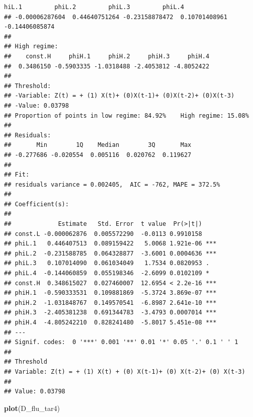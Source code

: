 \documentclass[
]{book}
\newenvironment{Shaded}{\begin{snugshade}}{\end{snugshade}}
\newcommand{\FunctionTok}[1]{\textcolor[rgb]{0.13,0.29,0.53}{\textbf{#1}}}
\newcommand{\NormalTok}[1]{#1}
\begin{document}
\begin{verbatim}
hiL.1         phiL.2         phiL.3         phiL.4 
## -0.00006287604  0.44640751264 -0.23158878472  0.10701408961 -0.14406085874 
## 
## High regime:
##    const.H     phiH.1     phiH.2     phiH.3     phiH.4 
##  0.3486150 -0.5903335 -1.0318488 -2.4053812 -4.8052422 
## 
## Threshold:
## -Variable: Z(t) = + (1) X(t)+ (0)X(t-1)+ (0)X(t-2)+ (0)X(t-3)
## -Value: 0.03798
## Proportion of points in low regime: 84.92%    High regime: 15.08% 
## 
## Residuals:
##       Min        1Q    Median        3Q       Max 
## -0.277686 -0.020554  0.005116  0.020762  0.119627 
## 
## Fit:
## residuals variance = 0.002405,  AIC = -762, MAPE = 372.5%
## 
## Coefficient(s):
## 
##             Estimate   Std. Error  t value  Pr(>|t|)    
## const.L -0.000062876  0.005572290  -0.0113 0.9910158    
## phiL.1   0.446407513  0.089159422   5.0068 1.921e-06 ***
## phiL.2  -0.231588785  0.064328877  -3.6001 0.0004636 ***
## phiL.3   0.107014090  0.061034049   1.7534 0.0820953 .  
## phiL.4  -0.144060859  0.055198346  -2.6099 0.0102109 *  
## const.H  0.348615027  0.027460007  12.6954 < 2.2e-16 ***
## phiH.1  -0.590333531  0.109881869  -5.3724 3.869e-07 ***
## phiH.2  -1.031848767  0.149570541  -6.8987 2.641e-10 ***
## phiH.3  -2.405381238  0.691344783  -3.4793 0.0007014 ***
## phiH.4  -4.805242210  0.828241480  -5.8017 5.451e-08 ***
## ---
## Signif. codes:  0 '***' 0.001 '**' 0.01 '*' 0.05 '.' 0.1 ' ' 1
## 
## Threshold
## Variable: Z(t) = + (1) X(t) + (0) X(t-1)+ (0) X(t-2)+ (0) X(t-3)
## 
## Value: 0.03798
\end{verbatim}

\begin{Shaded}
\begin{Highlighting}[]
\FunctionTok{plot}\NormalTok{(D\_flu\_tar4)}
\end{Highlighting}
\end{Shaded}
\end{document}

